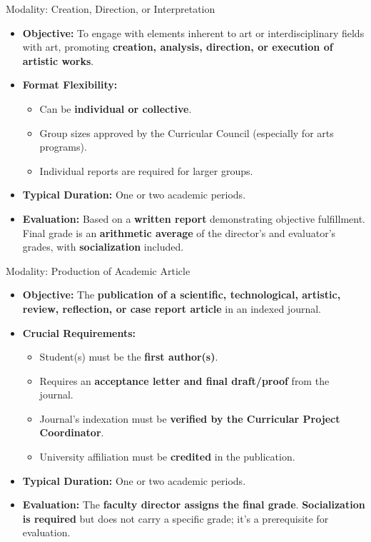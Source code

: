     \begin{frame}{Modality: Creation, Direction, or Interpretation}
      \begin{itemize}
        \item<1-> \textbf{Objective:} To engage with elements inherent to art or interdisciplinary fields with art, promoting \textbf{creation, analysis, direction, or execution of artistic works}.
        \item<2-> \textbf{Format Flexibility:}
          \begin{itemize}
            \item<3-> Can be \textbf{individual or collective}.
            \item<4-> Group sizes approved by the Curricular Council (especially for arts programs).
            \item<5-> Individual reports are required for larger groups.
          \end{itemize}
        \item<6-> \textbf{Typical Duration:} One or two academic periods.
        \item<7-> \textbf{Evaluation:} Based on a \textbf{written report} demonstrating objective fulfillment. Final grade is an \textbf{arithmetic average} of the director's and evaluator's grades, with \textbf{socialization} included.
      \end{itemize}
    \end{frame}

    \begin{frame}{Modality: Production of Academic Article}
      \begin{itemize}
        \item<1-> \textbf{Objective:} The \textbf{publication of a scientific, technological, artistic, review, reflection, or case report article} in an indexed journal.
        \item<2-> \textbf{Crucial Requirements:}
          \begin{itemize}
            \item<3-> Student(s) must be the \textbf{first author(s)}.
            \item<4-> Requires an \textbf{acceptance letter and final draft/proof} from the journal.
            \item<5-> Journal's indexation must be \textbf{verified by the Curricular Project Coordinator}.
            \item<6-> University affiliation must be \textbf{credited} in the publication.
          \end{itemize}
        \item<7-> \textbf{Typical Duration:} One or two academic periods.
        \item<8-> \textbf{Evaluation:} The \textbf{faculty director assigns the final grade}. \textbf{Socialization is required} but does not carry a specific grade; it's a prerequisite for evaluation.
      \end{itemize}
    \end{frame}

